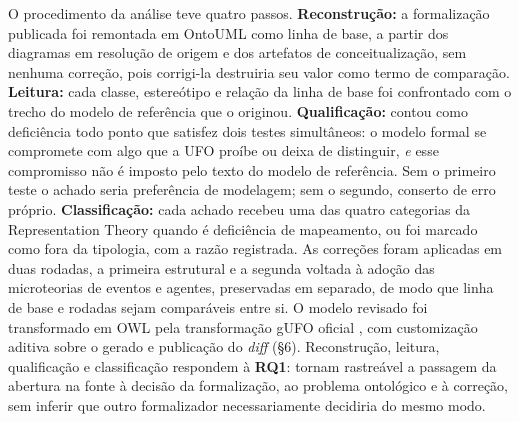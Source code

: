 O procedimento da análise teve quatro passos. \textbf{Reconstrução:} a formalização publicada foi remontada em OntoUML como linha de base, a partir dos diagramas em resolução de origem e dos artefatos de conceitualização, sem nenhuma correção, pois corrigi-la destruiria seu valor como termo de comparação. \textbf{Leitura:} cada classe, estereótipo e relação da linha de base foi confrontado com o trecho do modelo de referência que o originou. \textbf{Qualificação:} contou como deficiência todo ponto que satisfez dois testes simultâneos: o modelo formal se compromete com algo que a UFO proíbe ou deixa de distinguir, \textit{e} esse compromisso não é imposto pelo texto do modelo de referência. Sem o primeiro teste o achado seria preferência de modelagem; sem o segundo, conserto de erro próprio. \textbf{Classificação:} cada achado recebeu uma das quatro categorias da Representation Theory \cite{wand1993ontological} quando é deficiência de mapeamento, ou foi marcado como fora da tipologia, com a razão registrada. As correções foram aplicadas em duas rodadas, a primeira estrutural e a segunda voltada à adoção das microteorias de eventos e agentes, preservadas em separado, de modo que linha de base e rodadas sejam comparáveis entre si. O modelo revisado foi transformado em OWL pela transformação gUFO oficial \cite{almeida2019gufo}, com customização aditiva sobre o gerado e publicação do \textit{diff} (\S{}6). Reconstrução, leitura, qualificação e classificação respondem à \textbf{RQ1}: tornam rastreável a passagem da abertura na fonte à decisão da formalização, ao problema ontológico e à correção, sem inferir que outro formalizador necessariamente decidiria do mesmo modo.

